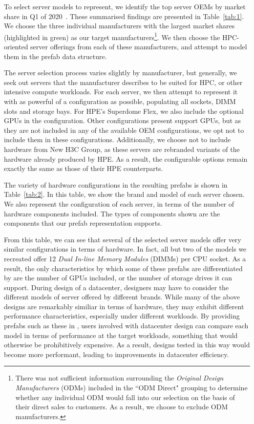 \documentclass[11pt]{article}
\begin{document}
			To select server models to represent, we identify the top server OEMs by market share in Q1 of 2020~\cite{Macatee2020}. These summarised findings are presented in Table~\ref{tab:1}.
			We choose the three individual manufacturers with the largest market shares (highlighted in green) as our target manufacturers\footnote{There was not sufficient information surrounding the \textit{Original Design Manufacturers} (ODMs) included in the ``ODM Direct" grouping to determine whether any individual ODM would fall into our selection on the basis of their direct sales to customers. As a result, we choose to exclude ODM manufacturers.}.
			We then choose the HPC-oriented server offerings from each of these manufacturers, and attempt to model them in the prefab data structure.
			
			The server selection process varies slightly by manufacturer, but generally, we seek out servers that the manufacturer describes to be suited for HPC, or other intensive compute workloads.
			For each server, we then attempt to represent it with as powerful of a configuration as possible, populating all sockets, DIMM slots and storage bays.
			For HPE's Superdome Flex, we also include the optional GPUs in the configuration.
			Other configurations present support GPUs, but as they are not included in any of the available OEM configurations, we opt not to include them in these configurations.
			Additionally, we choose not to include hardware from New H3C Group, as these servers are rebranded variants of the hardware already produced by HPE.
			As a result, the configurable options remain exactly the same as those of their HPE counterparts.

			The variety of hardware configurations in the resulting prefabs is shown in Table~\ref{tab:2}.
			In this table, we show the brand and model of each server chosen.
			We also represent the configuration of each server, in terms of the number of hardware components included.
			The types of components shown are the components that our prefab representation supports.

			From this table, we can see that several of the selected server models offer very similar configurations in terms of hardware.
			In fact, all but two of the models we recreated offer 12 \textit{Dual In-line Memory Modules} (DIMMs) per CPU socket.
			As a result, the only characteristics by which some of these prefabs are differentiated by are the number of GPUs included, or the number of storage drives it can support.
			During design of a datacenter, designers may have to consider the different models of server offered by different brands.
			While many of the above designs are remarkably similiar in terms of hardware, they may exhibit different performance characteristics, especially under different workloads.
			By providing prefabs such as these in \opendc{}, users involved with datacenter design can compare each model in terms of performance at the target workloads, something that would otherwise be prohibitively expensive.
			As a result, designs tested in this way would become more performant, leading to improvements in datacenter efficiency.
\end{document}
